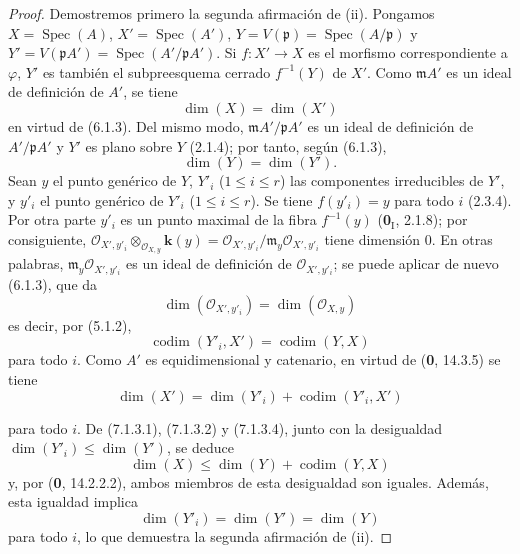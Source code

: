 \begin{proof}
Demostremos primero la segunda afirmación de (ii).
Pongamos $X=\operatorname{Spec}(A)$,
$X'=\operatorname{Spec}(A')$,
$Y=V(\mathfrak p)=\operatorname{Spec}(A/\mathfrak p)$
y $Y'=V(\mathfrak pA')=\operatorname{Spec}(A'/\mathfrak pA')$.
Si $f:X'\to X$ es el morfismo correspondiente a
$\varphi$, $Y'$ es también el subpreesquema cerrado
$f^{-1}(Y)$ de $X'$. Como $\mathfrak mA'$ es un ideal
de definición de $A'$, se tiene
\begin{equation}
\dim(X)=\dim(X')
\tag{7.1.3.1}
\label{IV.2.eq.7.1.3.1-fr}
\end{equation}
en virtud de (6.1.3). Del mismo modo,
$\mathfrak mA'/\mathfrak pA'$ es un ideal de definición
de $A'/\mathfrak pA'$ y $Y'$ es plano sobre $Y$ (2.1.4);
por tanto, según (6.1.3),
\begin{equation}
\dim(Y)=\dim(Y').
\tag{7.1.3.2}
\label{IV.2.eq.7.1.3.2-fr}
\end{equation}
Sean $y$ el punto genérico de $Y$, $Y'_i$
($1\leqslant i\leqslant r$) las componentes irreducibles
de $Y'$, y $y'_i$ el punto genérico de $Y'_i$
($1\leqslant i\leqslant r$). Se tiene $f(y'_i)=y$
para todo $i$ (2.3.4). Por otra parte $y'_i$ es un
punto maximal de la fibra $f^{-1}(y)$
(\textbf 0$_{\mathrm
I}$, 2.1.8); por consiguiente,
$\mathscr O_{X',y'_i}\otimes_{\mathscr O_{X,y}}\boldsymbol{k}(y)=
\mathscr O_{X',y'_i}/\mathfrak m_y\mathscr O_{X',y'_i}$
tiene dimensión 0. En otras palabras,
$\mathfrak m_y\mathscr O_{X',y'_i}$ es un ideal de definición
de $\mathscr O_{X',y'_i}$; se puede aplicar de nuevo
(6.1.3), que da
\begin{equation}
\dim(\mathscr O_{X',y'_i})=\dim(\mathscr O_{X,y})
\tag{7.1.3.3}
\label{IV.2.eq.7.1.3.3-fr}
\end{equation}
es decir, por (5.1.2),
\begin{equation}
\operatorname{codim}(Y'_i,X')=\operatorname{codim}(Y,X)
\tag{7.1.3.4}
\label{IV.2.eq.7.1.3.4-fr}
\end{equation}
para todo $i$. Como $A'$ es equidimensional y
catenario, en virtud de (\textbf 0, 14.3.5) se tiene
\begin{equation}
\dim(X')=\dim(Y'_i)+\operatorname{codim}(Y'_i,X')
\tag{7.1.3.5}
\label{IV.2.eq.7.1.3.5-fr}
\end{equation}

para todo $i$. De (7.1.3.1), (7.1.3.2) y
(7.1.3.4), junto con la desigualdad
$\dim(Y'_i)\leqslant\dim(Y')$, se deduce
\begin{equation}
\dim(X)\leqslant\dim(Y)+\operatorname{codim}(Y,X)
\tag{7.1.3.6}
\label{IV.2.eq.7.1.3.6-fr}
\end{equation}
y, por (\textbf 0, 14.2.2.2), ambos miembros de esta
desigualdad son iguales. Además, esta igualdad implica
\begin{equation}
\dim(Y'_i)=\dim(Y')=\dim(Y)
\tag{7.1.3.7}
\label{IV.2.eq.7.1.3.7-fr}
\end{equation}
para todo $i$, lo que demuestra la segunda afirmación
de (ii).


\end{proof}
